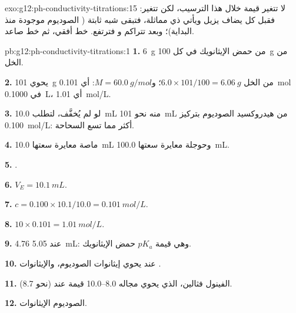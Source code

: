 \begin{solution}{exo:g12:ph-conductivity-titrations:15}
لا تتغير قيمة  خلال هذا الترسيب، لكن  تتغير:
فقبل  كل   يضاف يزيل   ويأتي 
 ذي  مماثلة، فتبقى  شبه
ثابتة ( الصوديوم موجودة منذ البداية)؛ وبعد  تتراكم  و
فترتفع. خط أفقي، ثم خط صاعد.
\end{solution}

\begin{solution}{pb:g12:ph-conductivity-titrations:1}
\textbf{1.} \qty{6}{g} من حمض الإيثانويك في كل \qty{100}{g} من الخل.

\textbf{2.} يحوي \qty{101}{g} من الخل $6.0 \times 101/100 =
\qty{6.06}{g}$؛ و$M = \qty{60.0}{g/mol}$: أي \qty{0.101}{mol} في
\qty{0.1000}{L}، أي \qty{1.01}{mol/L}.

\textbf{3.} لو لم يُخفَّف، لتطلب \qty{10.0}{mL} منه نحو \qty{101}{mL} من
هيدروكسيد الصوديوم بتركيز \qty{0.100}{mol/L}: أكثر مما تسع السحاحة.

\textbf{4.} ماصة معايرة سعتها \qty{10.0}{mL} وحوجلة معايرة سعتها \qty{100.0}{mL}.

\textbf{5.} .

\textbf{6.} $V_E = \qty{10.1}{mL}$.

\textbf{7.} $c = 0.100 \times 10.1 / 10.0 = \qty{0.101}{mol/L}$.

\textbf{8.} $10 \times 0.101 = \qty{1.01}{mol/L}$.

\textbf{9.}  4.76 عند \qty{5.05}{mL}: وهي قيمة $pK_a$ حمض الإيثانويك.

\textbf{10.} عند  يحوي  إيثانوات الصوديوم، والإيثانوات
.

\textbf{11.} الفينول فثالين، الذي يحوي مجاله 8.0--10.0 قيمة  عند
 (نحو 8.7).

\textbf{12.}  الصوديوم  الإيثانوات.


\end{solution}
